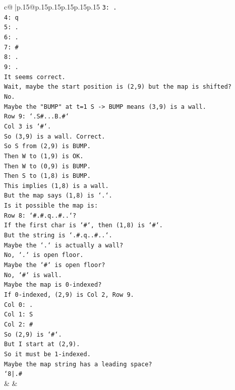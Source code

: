 \documentclass{article}
\begin{document}
{\begin{supertabular}{c@{$\;$}|p{.15\linewidth}@{}p{.15\linewidth}p{.15\linewidth}p{.15\linewidth}p{.15\linewidth}p{.15\linewidth}}
{{{\texttt{3: .} \\
\texttt{4: q} \\
\texttt{5: .} \\
\texttt{6: .} \\
\texttt{7: \#} \\
\texttt{8: .} \\
\texttt{9: .} \\
\texttt{It seems correct.} \\
\texttt{Wait, maybe the start position is (2,9) but the map is shifted?} \\
\texttt{No.} \\
\texttt{Maybe the "BUMP" at t=1 S {-}> BUMP means (3,9) is a wall.} \\
\texttt{Row 9: `.S\#...B.\#`} \\
\texttt{Col 3 is `\#`.} \\
\texttt{So (3,9) is a wall. Correct.} \\
\texttt{So S from (2,9) is BUMP.} \\
\texttt{Then W to (1,9) is OK.} \\
\texttt{Then W to (0,9) is BUMP.} \\
\texttt{Then S to (1,8) is BUMP.} \\
\texttt{This implies (1,8) is a wall.} \\
\texttt{But the map says (1,8) is `.`.} \\
\texttt{Is it possible the map is:} \\
\texttt{Row 8: `\#.\#.q..\#..`?} \\
\texttt{If the first char is `\#`, then (1,8) is `\#`.} \\
\texttt{But the string is `.\#.q..\#..`.} \\
\texttt{Maybe the `.` is actually a wall?} \\
\texttt{No, `.` is open floor.} \\
\texttt{Maybe the `\#` is open floor?} \\
\texttt{No, `\#` is wall.} \\
\texttt{Maybe the map is 0{-}indexed?} \\
\texttt{If 0{-}indexed, (2,9) is Col 2, Row 9.} \\
\texttt{Col 0: .} \\
\texttt{Col 1: S} \\
\texttt{Col 2: \#} \\
\texttt{So (2,9) is `\#`.} \\
\texttt{But I start at (2,9).} \\
\texttt{So it must be 1{-}indexed.} \\
\texttt{Maybe the map string has a leading space?} \\
\texttt{`8|.\#} \\
            }
        }
    }
    & & \\ \\


\end{supertabular}}
\end{document}

